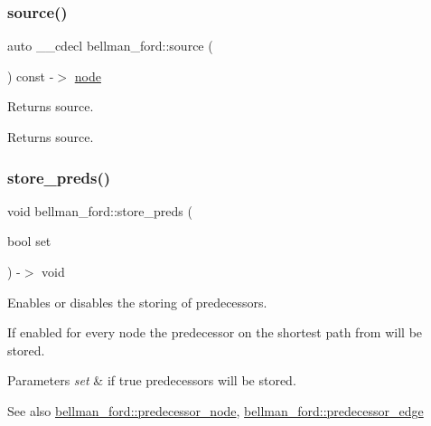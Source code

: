 \subsubsection{\texorpdfstring{source()}{source()}\hspace{0.1cm}{\footnotesize\ttfamily [2/2]}}
{\footnotesize\ttfamily auto \+\_\+\+\_\+cdecl bellman\+\_\+ford\+::source (\begin{DoxyParamCaption}{ }\end{DoxyParamCaption}) const -\/$>$ \mbox{\hyperlink{classnode}{node}} \hspace{0.3cm}{\ttfamily [inline]}}



Returns source. 

\begin{DoxyReturn}{Returns}
source. 
\end{DoxyReturn}
\mbox{\label{classbellman__ford_ab45cad1c97e011053efe6382f99b6cda}} 
\subsubsection{\texorpdfstring{store\+\_\+preds()}{store\_preds()}\hspace{0.1cm}{\footnotesize\ttfamily [1/2]}}
{\footnotesize\ttfamily void bellman\+\_\+ford\+::store\+\_\+preds (\begin{DoxyParamCaption}\item[{bool}]{set }\end{DoxyParamCaption}) -\/$>$ void}



Enables or disables the storing of predecessors. 

If enabled for every node the predecessor on the shortest path from will be stored.


\begin{DoxyParams}{Parameters}
{\em set} & if true predecessors will be stored. \\
\hline
\end{DoxyParams}
\begin{DoxySeeAlso}{See also}
\mbox{\hyperlink{classbellman__ford_a403e286ec8cbe3c30a7a729c5041155e}{bellman\+\_\+ford\+::predecessor\+\_\+node}}, \mbox{\hyperlink{classbellman__ford_a367c6fa92aaf08ddbc4c9545eabf6518}{bellman\+\_\+ford\+::predecessor\+\_\+edge}} 
\end{DoxySeeAlso}
\mbox{\label{classbellman__ford_ada19ef3d00b9377fa643775e103cbd2e}} 
